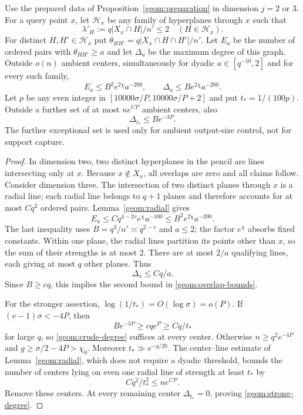\begin{lemma}\label{geom:overlap}
Use the prepared data of Proposition~\ref{geom:preparation} in
dimension $j=2$ or $3$. For a query point $x$, let $\mathcal H_x$
be any family of hyperplanes through $x$ such that
\[
 \lambda'_H:=q|X_x\cap H|/n'\leq2\quad(H\in\mathcal H_x).
\]
For distinct $H,H'\in\mathcal H_x$ put
$\theta_{HH'}=q|X_x\cap H\cap H'|/n'$.
Let $E_a$ be the number of ordered pairs with $\theta_{HH'}\geq a$
and let $\Delta_a$ be the maximum degree of this graph. Outside
$o(n)$ ambient centers, simultaneously for dyadic
$a\in[q^{-10},2]$ and for every such family,
\begin{equation}\label{geom:overlap-bounds}
 E_a\leq B^2e^{2\chi}a^{-200},\qquad
 \Delta_a\leq Be^{2\chi}a^{-200}.
\end{equation}
Let $p$ be any even integer in
$[10000\sigma/P,10000\sigma/P+2]$ and put
$t_*=1/(100p)$. Outside a further set of at most $ne^{CP}$ ambient
centers, also
\begin{equation}\label{geom:strong-degree}
 \Delta_{t_*}\leq Be^{-3P}.
\end{equation}
The further exceptional set is used only for ambient output-size
control, not for support capture.
\end{lemma}

\begin{proof}
In dimension two, two distinct hyperplanes in the pencil are lines
intersecting only at $x$. Because $x\notin X_x$, all overlaps are
zero and all claims follow. Consider dimension three. The
intersection of two distinct planes through $x$ is a radial line;
each radial line belongs to $q+1$ planes and therefore accounts for
at most $Cq^2$ ordered pairs. Lemma~\ref{geom:radial} gives
\[
 E_a\leq Cq^{4-2v}e^\chi a^{-100}
 \leq B^2e^{2\chi}a^{-200}.
\]
The last inequality uses $B=q^3/n'\asymp q^{2-v}$ and $a\leq2$;
the factor $e^\chi$ absorbs fixed constants. Within one plane,
the radial lines partition its points other than $x$, so the sum
of their strengths is at most $2$. There are at most $2/a$
qualifying lines, each giving at most $q$ other planes. Thus
\begin{equation}\label{geom:crude-degree}
 \Delta_a\leq Cq/a.
\end{equation}
Since $B\geq cq$, this implies the second bound in
\eqref{geom:overlap-bounds}.

For the stronger assertion, $\log(1/t_*)=O(\log\sigma)=o(P)$.
If $(v-1)\sigma<-4P$, then
\[
 Be^{-3P}\geq cq e^P\geq Cq/t_*
\]
for large $q$, so \eqref{geom:crude-degree} suffices at every
center. Otherwise $n\geq q^2e^{-4P}$ and
$g\geq\sigma/2-4P>\chi_0$. Moreover
$t_*\gg e^{-g/20}$. The center--line estimate of
Lemma~\ref{geom:radial}, which does not require a dyadic threshold,
bounds the number of centers lying on even one radial line of
strength at least $t_*$ by
\[
 Cq^2/t_*^2\leq ne^{CP}.
\]
Remove these centers. At every remaining center
$\Delta_{t_*}=0$, proving \eqref{geom:strong-degree}.
\end{proof}

